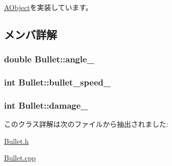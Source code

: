 \hyperlink{class_a_object_a61f89197cb14b1270a0a232ee88333a0}{A\+Object}を実装しています。



\subsection{メンバ詳解}
\hypertarget{class_bullet_a70eee9d25fde596eb251251e3806a6cc}{
\subsubsection[{angle\+\_\+}]{\setlength{\rightskip}{0pt plus 5cm}double Bullet\+::angle\+\_\+\hspace{0.3cm}{\ttfamily [protected]}}}\label{class_bullet_a70eee9d25fde596eb251251e3806a6cc}
\hypertarget{class_bullet_aff48665a8060391eaca9bb2d38b8492f}{
\subsubsection[{bullet\+\_\+speed\+\_\+}]{\setlength{\rightskip}{0pt plus 5cm}int Bullet\+::bullet\+\_\+speed\+\_\+\hspace{0.3cm}{\ttfamily [protected]}}}\label{class_bullet_aff48665a8060391eaca9bb2d38b8492f}
\hypertarget{class_bullet_aaa26f3bff8a6f418831cf7458e018b40}{
\subsubsection[{damage\+\_\+}]{\setlength{\rightskip}{0pt plus 5cm}int Bullet\+::damage\+\_\+\hspace{0.3cm}{\ttfamily [protected]}}}\label{class_bullet_aaa26f3bff8a6f418831cf7458e018b40}


このクラス詳解は次のファイルから抽出されました\+:\begin{DoxyCompactItemize}
\item 
\hyperlink{_bullet_8h}{Bullet.\+h}\item 
\hyperlink{_bullet_8cpp}{Bullet.\+cpp}\end{DoxyCompactItemize}

